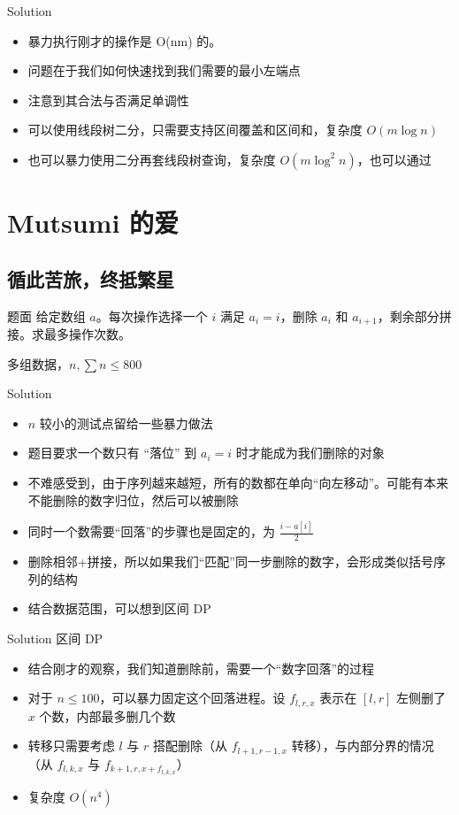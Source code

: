﻿\documentclass[aspectratio=169]{ctexbeamer}
\begin{document}
\begin{frame}{Solution}
    \begin{itemize}
        \item 暴力执行刚才的操作是 O(nm) 的。
        \item 问题在于我们如何快速找到我们需要的最小左端点
        \item 注意到其合法与否满足单调性
        \item 可以使用线段树二分，只需要支持区间覆盖和区间和，复杂度 $O(m\log n)$
        \item 也可以暴力使用二分再套线段树查询，复杂度 $O(m\log^2 n)$，也可以通过
    \end{itemize}
\end{frame}


\section{Mutsumi 的爱}
\subsection{循此苦旅，终抵繁星}
\begin{frame}{题面}
    给定数组 $a$。每次操作选择一个 $i$ 满足 $a_i=i$，删除 $a_i$ 和 $a_{i+1}$，剩余部分拼接。求最多操作次数。
    
    多组数据，$n,\sum n\le 800$
\end{frame}

\begin{frame}{Solution}
    \begin{itemize}
        \item $n$ 较小的测试点留给一些暴力做法
        \item 题目要求一个数只有 “落位” 到 $a_i=i$ 时才能成为我们删除的对象
        \item 不难感受到，由于序列越来越短，所有的数都在单向“向左移动”。可能有本来不能删除的数字归位，然后可以被删除
        \item 同时一个数需要“回落”的步骤也是固定的，为 $\frac{i-a[i]}{2}$
        \item 删除相邻+拼接，所以如果我们“匹配”同一步删除的数字，会形成类似括号序列的结构
        \item 结合数据范围，可以想到区间 DP
    \end{itemize}
\end{frame}

\begin{frame}{Solution}
    区间 DP
    \begin{itemize}
        \item 结合刚才的观察，我们知道删除前，需要一个“数字回落”的过程
        \item 对于 $n\le 100$，可以暴力固定这个回落进程。设 $f_{l,r,x}$ 表示在 $[l,r]$ 左侧删了 $x$ 个数，内部最多删几个数
        \item 转移只需要考虑 $l$ 与 $r$ 搭配删除（从 $f_{l+1,r-1,x}$ 转移），与内部分界的情况（从 $f_{l,k,x}$ 与 $f_{k+1,r,x+f_{l,k,x}}$）
        \item 复杂度 $O(n^4)$
    \end{itemize}
\end{frame}
\end{document}
